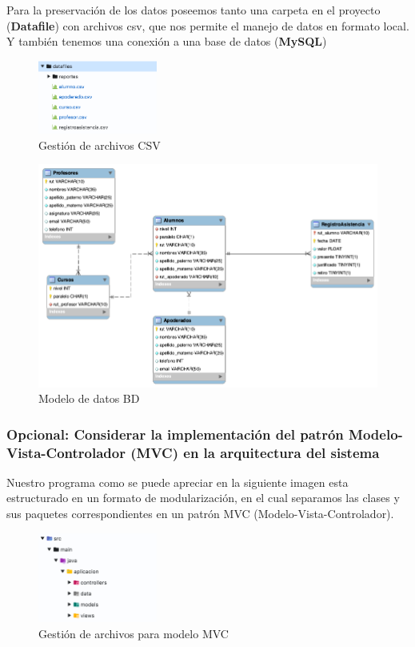 Para la preservación de los datos poseemos tanto una carpeta en el proyecto (\textbf{Datafile}) con archivos csv, que nos permite el manejo de datos en formato local. Y también tenemos una conexión a una base de datos (\textbf{MySQL})

\begin{figure}[h]
    \centering
    \includegraphics[width=0.35\textwidth]{contents/img/img12}
    \caption{Gestión de archivos CSV}
    \label{fig:img12}
\end{figure}

\clearpage

\begin{figure}[h]
    \centering
    \includegraphics[width=1\textwidth]{contents/img/img13}
    \caption{Modelo de datos BD}
    \label{fig:img13}
\end{figure}

\subsubsection*{Opcional: Considerar la implementación del patrón Modelo-Vista-Controlador (MVC) en la arquitectura del sistema}

Nuestro programa como se puede apreciar en la siguiente imagen  esta estructurado en un formato de modularización, en el cual separamos las clases y sus paquetes correspondientes  en un patrón MVC (Modelo-Vista-Controlador).

\begin{figure}[h]
    \centering
    \includegraphics[width=0.35\textwidth]{contents/img/img14}
    \caption{Gestión de archivos para modelo MVC}
    \label{fig:img14}
\end{figure}
